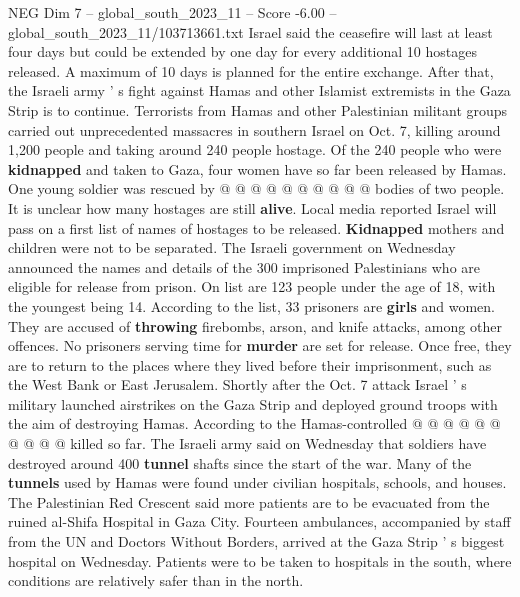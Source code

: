 \begin{textsample}{NEG Dim 7 – global\_south\_2023\_11 – Score -6.00 – global\_south\_2023\_11/103713661.txt}
Israel said the ceasefire will last at least four days but could be extended by one day for every additional 10 hostages released.
A maximum of 10 days is planned for the entire exchange.
After that, the Israeli army ' s fight against Hamas and other Islamist extremists in the Gaza Strip is to continue.
Terrorists from Hamas and other Palestinian militant groups carried out unprecedented massacres in southern Israel on Oct. 7, killing around 1,200 people and taking around 240 people hostage.
Of the 240 people who were \textbf{kidnapped} and taken to Gaza, four women have so far been released by Hamas.
One young soldier was rescued by @ @ @ @ @ @ @ @ @ @ bodies of two people.
It is unclear how many hostages are still \textbf{alive}.
Local media reported Israel will pass on a first list of names of hostages to be released. \textbf{Kidnapped} mothers and children were not to be separated.
The Israeli government on Wednesday announced the names and details of the 300 imprisoned Palestinians who are eligible for release from prison.
On list are 123 people under the age of 18, with the youngest being 14.
According to the list, 33 prisoners are \textbf{girls} and women.
They are accused of \textbf{throwing} firebombs, arson, and knife attacks, among other offences.
No prisoners serving time for \textbf{murder} are set for release.
Once free, they are to return to the places where they lived before their imprisonment, such as the West Bank or East Jerusalem.
Shortly after the Oct. 7 attack Israel ' s military launched airstrikes on the Gaza Strip and deployed ground troops with the aim of destroying Hamas.
According to the Hamas-controlled @ @ @ @ @ @ @ @ @ @ killed so far.
The Israeli army said on Wednesday that soldiers have destroyed around 400 \textbf{tunnel} shafts since the start of the war.
Many of the \textbf{tunnels} used by Hamas were found under civilian hospitals, schools, and houses.
The Palestinian Red Crescent said more patients are to be evacuated from the ruined al-Shifa Hospital in Gaza City.
Fourteen ambulances, accompanied by staff from the UN and Doctors Without Borders, arrived at the Gaza Strip ' s biggest hospital on Wednesday.
Patients were to be taken to hospitals in the south, where conditions are relatively safer than in the north.

\end{textsample}
